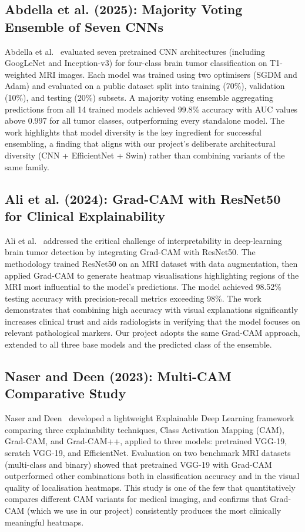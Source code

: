 \documentclass[12pt,a4paper,oneside]{report}
\begin{document}
\subsection{Abdella et al. (2025): Majority Voting Ensemble of Seven CNNs}

Abdella et al.~\cite{abdella2025majority} evaluated seven pretrained CNN architectures (including GoogLeNet and Inception-v3) for four-class brain tumor classification on T1-weighted MRI images. Each model was trained using two optimisers (SGDM and Adam) and evaluated on a public dataset split into training (70\%), validation (10\%), and testing (20\%) subsets. A majority voting ensemble aggregating predictions from all 14 trained models achieved 99.8\% accuracy with AUC values above 0.997 for all tumor classes, outperforming every standalone model. The work highlights that model diversity is the key ingredient for successful ensembling, a finding that aligns with our project's deliberate architectural diversity (CNN + EfficientNet + Swin) rather than combining variants of the same family.

\subsection{Ali et al. (2024): Grad-CAM with ResNet50 for Clinical Explainability}

Ali et al.~\cite{ali2024gradcam} addressed the critical challenge of interpretability in deep-learning brain tumor detection by integrating Grad-CAM with ResNet50. The methodology trained ResNet50 on an MRI dataset with data augmentation, then applied Grad-CAM to generate heatmap visualisations highlighting regions of the MRI most influential to the model's predictions. The model achieved 98.52\% testing accuracy with precision-recall metrics exceeding 98\%. The work demonstrates that combining high accuracy with visual explanations significantly increases clinical trust and aids radiologists in verifying that the model focuses on relevant pathological markers. Our project adopts the same Grad-CAM approach, extended to all three base models and the predicted class of the ensemble.

\subsection{Naser and Deen (2023): Multi-CAM Comparative Study}

Naser and Deen~\cite{naser2023gradcam} developed a lightweight Explainable Deep Learning framework comparing three explainability techniques, Class Activation Mapping (CAM), Grad-CAM, and Grad-CAM++, applied to three models: pretrained VGG-19, scratch VGG-19, and EfficientNet. Evaluation on two benchmark MRI datasets (multi-class and binary) showed that pretrained VGG-19 with Grad-CAM outperformed other combinations both in classification accuracy and in the visual quality of localisation heatmaps. This study is one of the few that quantitatively compares different CAM variants for medical imaging, and confirms that Grad-CAM (which we use in our project) consistently produces the most clinically meaningful heatmaps.
\end{document}
